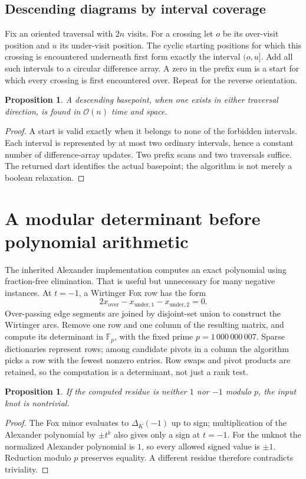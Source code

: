 \documentclass[11pt]{article}
\newtheorem{proposition}[theorem]{Proposition}
\theoremstyle{remark}\newtheorem{remark}[theorem]{Remark}
\newcommand{\F}{\mathbb F}
\newcommand{\OO}{\mathcal O}
\begin{document}
\subsection{Descending diagrams by interval coverage}

Fix an oriented traversal with $2n$ visits. For a crossing let $o$ be its
over-visit position and $u$ its under-visit position. The cyclic starting
positions for which this crossing is encountered underneath first form
exactly the interval $(o,u]$. Add all such intervals to a circular difference
array. A zero in the prefix sum is a start for which every crossing is first
encountered over. Repeat for the reverse orientation.

\begin{proposition}
A descending basepoint, when one exists in either traversal direction, is
found in $\OO(n)$ time and space.
\end{proposition}
\begin{proof}
A start is valid exactly when it belongs to none of the forbidden intervals.
Each interval is represented by at most two ordinary intervals, hence a
constant number of difference-array updates. Two prefix scans and two
traversals suffice. The returned dart identifies the actual basepoint; the
algorithm is not merely a boolean relaxation.
\end{proof}

\section{A modular determinant before polynomial arithmetic}
\label{sec:det}

The inherited Alexander implementation computes an exact polynomial using
fraction-free elimination. That is useful but unnecessary for many negative
instances. At $t=-1$, a Wirtinger Fox row has the form
\[
 2x_{\mathrm{over}}-x_{\mathrm{under},1}-x_{\mathrm{under},2}=0.
\]
Over-passing edge segments are joined by disjoint-set union to construct the
Wirtinger arcs. Remove one row and one column of the resulting matrix, and
compute its determinant in $\F_p$, with the fixed prime
$p=1\,000\,000\,007$. Sparse dictionaries represent rows; among candidate
pivots in a column the algorithm picks a row with the fewest nonzero
entries. Row swaps and pivot products are retained, so the computation is
a determinant, not just a rank test.

\begin{proposition}
If the computed residue is neither $1$ nor $-1$ modulo $p$, the input knot
is nontrivial.
\end{proposition}
\begin{proof}
The Fox minor evaluates to $\Delta_K(-1)$ up to sign; multiplication of the
Alexander polynomial by $\pm t^k$ also gives only a sign at $t=-1$. For the
unknot the normalized Alexander polynomial is $1$, so every allowed signed
value is $\pm1$. Reduction modulo $p$ preserves equality. A different
residue therefore contradicts triviality.
\end{proof}
\end{document}
